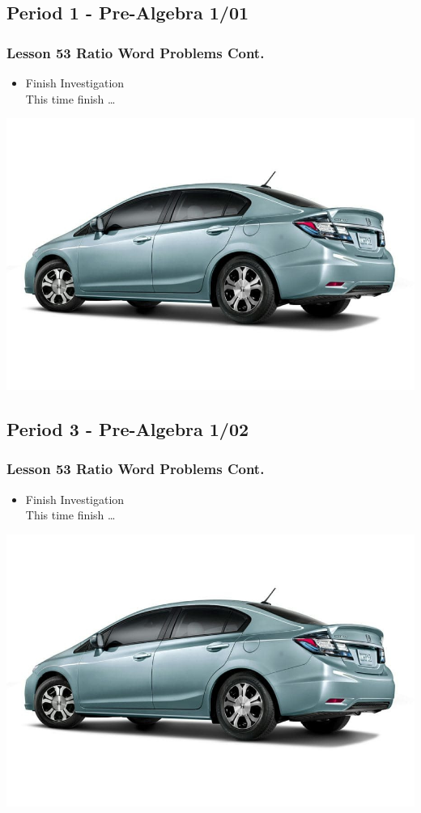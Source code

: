  \subsection[PA1/01]{Period 1 - Pre-Algebra 1/01}
 \begin{frame}[label=PA1_01]
  	       	\frametitle{Lesson 53 Ratio Word Problems Cont.}   	
  	       	
  	       	\begin{itemize}
  	       		\item Finish  Investigation 
  	       		\\ This time  finish \dots
  	       	\end{itemize}   
  	       	\vspace{-20pt}
  	       	\begin{center}
  	       		\includegraphics[width=0.5\linewidth]{Images/honda_civic}
  	       	\end{center}      
  	       	\vspace{-20pt}
  	       \end{frame}
 
  \subsection[PA1/02]{Period 3 - Pre-Algebra 1/02}
	 \begin{frame}[label=PA1_02]
	 	       	\frametitle{Lesson 53 Ratio Word Problems Cont.}   	
	 	       	
	 	       	\begin{itemize}
	 	       		\item Finish  Investigation 
	 	       		\\ This time  finish \dots
	 	       	\end{itemize}   
	 	       	\vspace{-20pt}
	 	       	\begin{center}
	 	       		\includegraphics[width=0.5\linewidth]{Images/honda_civic}
	 	       	\end{center}      
	 	       	\vspace{-20pt}
	 	       \end{frame}
	 
